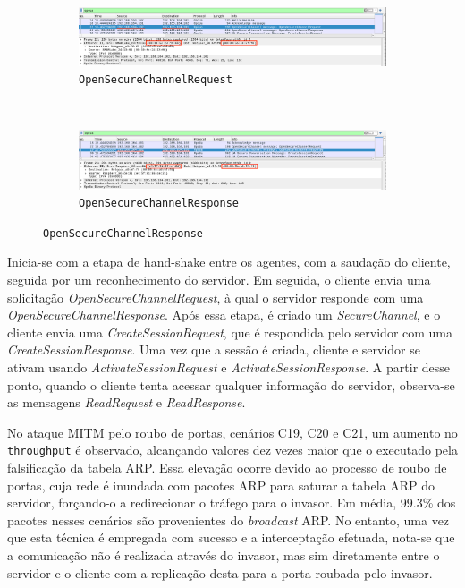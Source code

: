 \begin{figure}[htbp!]
    \centering
    \caption{\label{fig:0-mitm-wireshark}Interceptação de pacotes no ataque MITM com modo de segurança `None'}
    \begin{subfigure}[t]{1\textwidth}
        \centering
        \caption{\texttt{OpenSecureChannelRequest}}
        \includegraphics[width=1\textwidth]{USPSC-img/0-mitm-arp_1.png}
    \end{subfigure}%
    \\
    \begin{subfigure}[t]{1\textwidth}
        \centering
        \caption{\texttt{OpenSecureChannelResponse}}
        \includegraphics[width=1\textwidth]{USPSC-img/0-mitm-arp_2.png}
    \end{subfigure}%
\end{figure}

Inicia-se com a etapa de hand-shake entre os agentes, com a saudação do cliente, seguida por um reconhecimento do servidor. Em seguida, o cliente envia uma solicitação \textit{OpenSecureChannelRequest}, à qual o servidor responde com uma \textit{OpenSecureChannelResponse}. Após essa etapa, é criado um \textit{SecureChannel}, e o cliente envia uma \textit{CreateSessionRequest}, que é respondida pelo servidor com uma \textit{CreateSessionResponse}. Uma vez que a sessão é criada, cliente e servidor se ativam usando \textit{ActivateSessionRequest} e \textit{ActivateSessionResponse}. A partir desse ponto, quando o cliente tenta acessar qualquer informação do servidor, observa-se as mensagens \textit{ReadRequest} e \textit{ReadResponse}.

No ataque MITM pelo roubo de portas, cenários C19, C20 e C21, um aumento no \texttt{throughput} é observado, alcançando valores dez vezes maior que o executado pela falsificação da tabela ARP. Essa elevação ocorre devido ao processo de roubo de portas, cuja rede é inundada com pacotes ARP para saturar a tabela ARP do servidor, forçando-o a redirecionar o tráfego para o invasor. Em média, 99.3\% dos pacotes nesses cenários são provenientes do \textit{broadcast} ARP. No entanto, uma vez que esta técnica é empregada com sucesso e a interceptação efetuada, nota-se que a comunicação não é realizada através do invasor, mas sim diretamente entre o servidor e o cliente com a replicação desta para a porta roubada pelo invasor.

